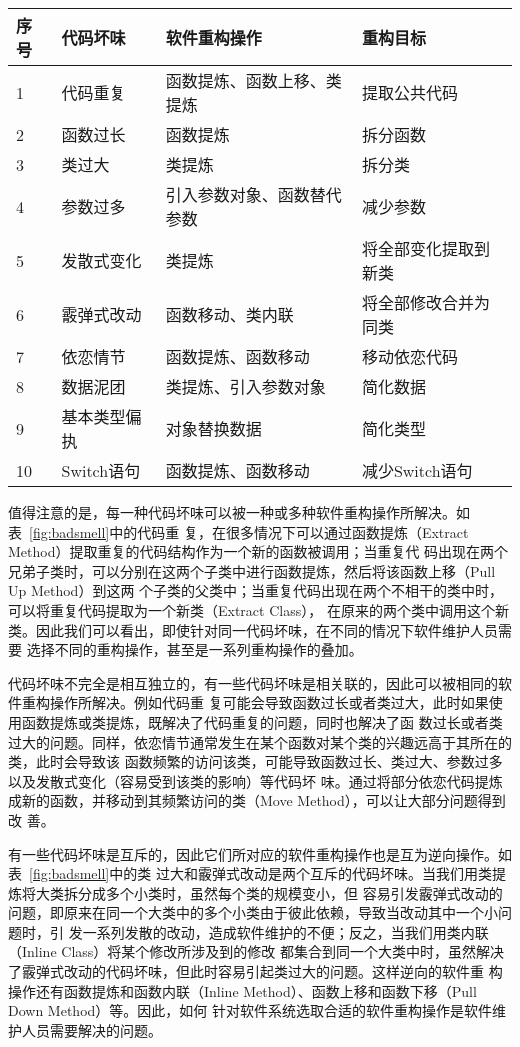 \begin{center}
\label{fig:badsmell}
\begin{tabular}{|l|l|l|l|}
\hline
序号 & 代码坏味 & 软件重构操作 & 重构目标\\ \hline
1 & 代码重复 & 函数提炼、函数上移、类提炼 & 提取公共代码\\ \hline
2 & 函数过长 & 函数提炼 & 拆分函数\\ \hline
3 & 类过大 & 类提炼 & 拆分类\\ \hline
4 & 参数过多 & 引入参数对象、函数替代参数 & 减少参数\\ \hline
5 & 发散式变化& 类提炼 & 将全部变化提取到新类\\ \hline
6 & 霰弹式改动& 函数移动、类内联 & 将全部修改合并为同类\\ \hline
7 & 依恋情节& 函数提炼、函数移动 & 移动依恋代码\\ \hline
8 & 数据泥团& 类提炼、引入参数对象 & 简化数据\\ \hline
9 & 基本类型偏执& 对象替换数据 & 简化类型 \\ \hline
10 & Switch语句 & 函数提炼、函数移动 & 减少Switch语句\\ \hline
\end{tabular}
\end{center}

值得注意的是，每一种代码坏味可以被一种或多种软件重构操作所解决。如表~\ref{fig:badsmell}中的代码重
复，在很多情况下可以通过函数提炼（Extract Method）提取重复的代码结构作为一个新的函数被调用；当重复代
码出现在两个兄弟子类时，可以分别在这两个子类中进行函数提炼，然后将该函数上移（Pull Up Method）到这两
个子类的父类中；当重复代码出现在两个不相干的类中时，可以将重复代码提取为一个新类（Extract Class），
在原来的两个类中调用这个新类。因此我们可以看出，即使针对同一代码坏味，在不同的情况下软件维护人员需要
选择不同的重构操作，甚至是一系列重构操作的叠加。

代码坏味不完全是相互独立的，有一些代码坏味是相关联的，因此可以被相同的软件重构操作所解决。例如代码重
复可能会导致函数过长或者类过大，此时如果使用函数提炼或类提炼，既解决了代码重复的问题，同时也解决了函
数过长或者类过大的问题。同样，依恋情节通常发生在某个函数对某个类的兴趣远高于其所在的类，此时会导致该
函数频繁的访问该类，可能导致函数过长、类过大、参数过多以及发散式变化（容易受到该类的影响）等代码坏
味。通过将部分依恋代码提炼成新的函数，并移动到其频繁访问的类（Move Method），可以让大部分问题得到改
善。

有一些代码坏味是互斥的，因此它们所对应的软件重构操作也是互为逆向操作。如表~\ref{fig:badsmell}中的类
过大和霰弹式改动是两个互斥的代码坏味。当我们用类提炼将大类拆分成多个小类时，虽然每个类的规模变小，但
容易引发霰弹式改动的问题，即原来在同一个大类中的多个小类由于彼此依赖，导致当改动其中一个小问题时，引
发一系列发散的改动，造成软件维护的不便；反之，当我们用类内联（Inline Class）将某个修改所涉及到的修改
都集合到同一个大类中时，虽然解决了霰弹式改动的代码坏味，但此时容易引起类过大的问题。这样逆向的软件重
构操作还有函数提炼和函数内联（Inline Method）、函数上移和函数下移（Pull Down Method）等。因此，如何
针对软件系统选取合适的软件重构操作是软件维护人员需要解决的问题。

